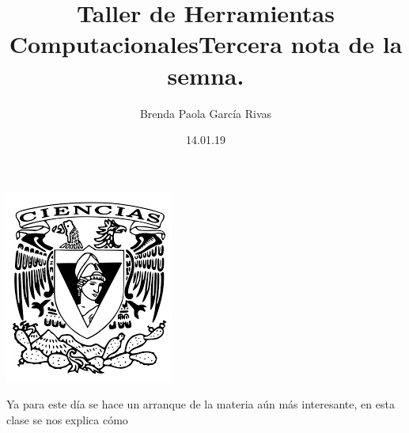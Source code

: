 \documentclass[letterpaper, 12pt, oneside]{article}
\title{\Huge\color{green} Taller de Herramientas Computacionales}
\author{Brenda Paola García Rivas}
\date{14.01.19}
\begin{document}
	\maketitle
	\begin{center}
		\includegraphics[scale=0.95]{1.png}
	\end{center}
	\newpage
	\title{Tercera nota de la semna.\\}
	Ya para este día se hace un arranque de la materia aún más interesante, en esta clase se nos explica cómo 
	
\end{document}
